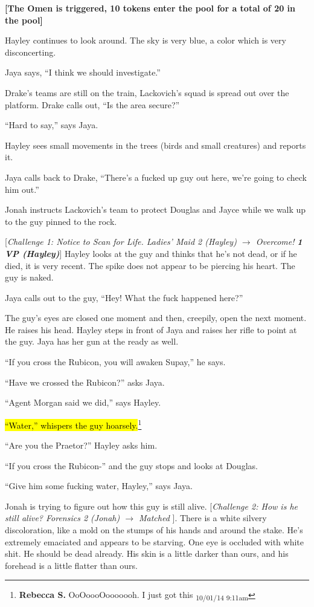 \textbf{{[}The Omen is triggered, 10 tokens enter the pool for a total of 20 in the pool{]}}



Hayley continues to look around.  The sky is very blue, a color which is very disconcerting.

Jaya says, ``I think we should investigate.''

Drake's teams are still on the train, Lackovich's squad is spread out over the platform.  Drake calls out, ``Is the area secure?''

``Hard to say,'' says Jaya.  

Hayley sees small movements in the trees (birds and small creatures) and reports it.  

Jaya calls back to Drake, ``There's a fucked up guy out here, we're going to check him out.''

Jonah instructs Lackovich's team to protect Douglas and Jayce while we walk up to the guy pinned to the rock.



{[}\textit{Challenge 1: Notice to Scan for Life.  Ladies' Maid 2 (Hayley) $\rightarrow$ Overcome! }\textit{\textbf{1 VP (Hayley)}}{]}  Hayley looks at the guy and thinks that he's not dead, or if he died, it is very recent.  The spike does not appear to be piercing his heart.  The guy is naked.

Jaya calls out to the guy, ``Hey!  What the fuck happened here?''

The guy's eyes are closed one moment and then, creepily, open the next moment. He raises his head.  Hayley steps in front of Jaya and raises her rifle to point at the guy.  Jaya has her gun at the ready as well.

``If you cross the Rubicon, you will awaken Supay,'' he says.

``Have we crossed the Rubicon?'' asks Jaya.

``Agent Morgan said we did,'' says Hayley. 

\hl{``Water,'' whispers the guy hoarsely.}\footnote{\textbf{Rebecca S. }OoOoooOooooooh.  I just got this \textsubscript{10/01/14 9:11am}}

``Are you the Praetor?'' Hayley asks him.

``If you cross the Rubicon-'' and the guy stops and looks at Douglas.

``Give him some fucking water, Hayley,'' says Jaya.

Jonah is trying to figure out how this guy is still alive.  {[}\textit{Challenge 2:  How is he still alive?  Forensics 2 (Jonah) $\rightarrow$ Matched }{]}. There is a white silvery discoloration, like a mold on the stumps of his hands and around the stake.  He's extremely emaciated and appears to be starving.  One eye is occluded with white shit.  He should be dead already.  His skin is a little darker than ours, and his forehead is a little flatter than ours.

